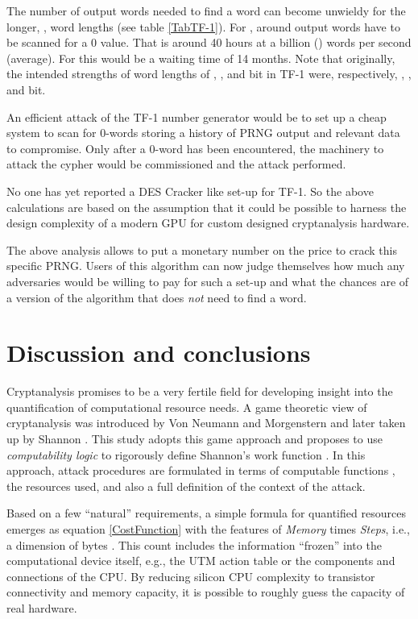 \documentclass{article}
\begin{document}
The number of
output words needed to find a  word can become unwieldy for the longer,
 , word lengths (see table \ref{TabTF-1}). For , around 
  output words have to be scanned for a 0 value. 
 That is around 40 hours at a billion () words per second (average). 
 For  this would be a waiting time of 14 months. 
Note that originally, the intended strengths of
word lengths of , , and  bit in TF-1 were, respectively, 
, , and  bit.

An efficient attack of the TF-1 number generator would be to set up a cheap system to 
scan for 0-words storing a history of PRNG output and relevant data to compromise. 
Only after a 0-word has been encountered, the machinery to attack the cypher would be 
commissioned and the attack performed.  

No one has yet reported a DES Cracker like set-up for TF-1. So the above
calculations are based on the assumption that it could be possible to harness
the design complexity of a modern GPU for custom designed cryptanalysis
hardware.

The above analysis
allows to put a monetary number on the price to crack this specific PRNG. Users
of this algorithm can now judge themselves how much any adversaries would be
willing to pay for such a set-up and what the chances are of a version of the
algorithm that does \textit{not} need to find a  word.

\section{Discussion and conclusions}\label{SectDiscussion}

Cryptanalysis promises to be a very fertile field for
developing insight into the quantification of computational resource needs.
A game theoretic view of cryptanalysis was introduced by Von Neumann and 
Morgenstern and later taken up by Shannon \cite{NeumanMorgenstern1947,Shannon1949}.
This study adopts this game approach and proposes to use \textit{computability logic}
\cite{japaridze2005,GiorgiJaparidze08012006,Son0911-5262} to rigorously define
Shannon's work function  \cite{Shannon1949}. In this approach, attack procedures are 
formulated in terms of computable functions \cite{Turing1936CNA}, the resources used, 
and also a full definition of the context of the attack.

Based on a few ``natural'' requirements, a simple formula for quantified
resources emerges as equation \ref{CostFunction} with the features of 
\textit{Memory} times \textit{Steps}, i.e., a dimension of bytes 
\cite{Son0911-5262}. This count includes the information
``frozen'' into the computational device itself, e.g., the UTM action table or the
components and connections of the CPU. By reducing silicon CPU complexity to
transistor connectivity and memory capacity, it is possible to roughly guess the
capacity of real hardware. 
\end{document}
